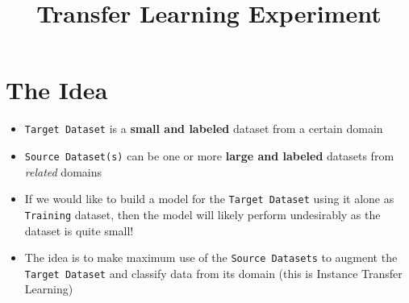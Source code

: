 \documentclass[a4paper,12pt, english]{article}
\begin{document}
\title{Transfer Learning Experiment}
\maketitle

\section{The Idea}
\begin{itemize}
\item \texttt{Target Dataset} is a \textbf{small and labeled} dataset from a certain domain
\item \texttt{Source Dataset(s)} can be one or more \textbf{large and labeled} datasets from \emph{related} domains 
\item If we would like to build a model for the \texttt{Target Dataset} using it alone as \texttt{Training} dataset, then the model will likely perform undesirably as the dataset is quite small!
\item The idea is to make maximum use of the \texttt{Source Datasets} to augment the \texttt{Target Dataset} and classify data from its domain (this is Instance Transfer Learning)
\end{itemize}  
\end{document}
